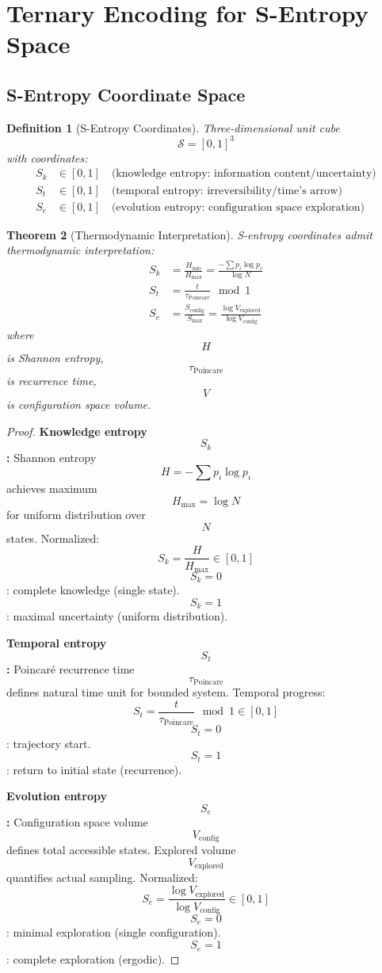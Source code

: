 \documentclass[11pt,twocolumn,a4paper]{article}
\newtheorem{theorem}{Theorem}[section]
\newtheorem{definition}[theorem]{Definition}
\theoremstyle{remark}
\begin{document}
\section{Ternary Encoding for S-Entropy Space}
\label{sec:ternary}

\subsection{S-Entropy Coordinate Space}

\begin{definition}[S-Entropy Coordinates]
\label{def:s_entropy}
Three-dimensional unit cube $$\mathcal{S} = [0,1]^3$$ with coordinates:
\begin{align}
S_k &\in [0,1] \quad \text{(knowledge entropy: information content/uncertainty)} \\
S_t &\in [0,1] \quad \text{(temporal entropy: irreversibility/time's arrow)} \\
S_e &\in [0,1] \quad \text{(evolution entropy: configuration space exploration)}
\end{align}
\end{definition}

\begin{theorem}[Thermodynamic Interpretation]
\label{thm:s_thermo}
S-entropy coordinates admit thermodynamic interpretation:
\begin{align}
S_k &= \frac{H_{\mathrm{info}}}{H_{\mathrm{max}}} = \frac{-\sum p_i \log p_i}{\log N} \\
S_t &= \frac{t}{\tau_{\mathrm{Poincare}}} \mod 1 \\
S_e &= \frac{S_{\mathrm{config}}}{S_{\mathrm{max}}} = \frac{\log V_{\mathrm{explored}}}{\log V_{\mathrm{config}}}
\end{align}
where $$H$$ is Shannon entropy, $$\tau_{\mathrm{Poincare}}$$ is recurrence time, $$V$$ is configuration space volume.
\end{theorem}

\begin{proof}
\textbf{Knowledge entropy $$S_k$$:} Shannon entropy $$H = -\sum p_i \log p_i$$ achieves maximum $$H_{\mathrm{max}} = \log N$$ for uniform distribution over $$N$$ states. Normalized:
$$
S_k = \frac{H}{H_{\mathrm{max}}} \in [0,1]
$$
$$S_k = 0$$: complete knowledge (single state). $$S_k = 1$$: maximal uncertainty (uniform distribution).

\textbf{Temporal entropy $$S_t$$:} Poincaré recurrence time $$\tau_{\mathrm{Poincare}}$$ defines natural time unit for bounded system. Temporal progress:
$$
S_t = \frac{t}{\tau_{\mathrm{Poincare}}} \mod 1 \in [0,1]
$$
$$S_t = 0$$: trajectory start. $$S_t = 1$$: return to initial state (recurrence).

\textbf{Evolution entropy $$S_e$$:} Configuration space volume $$V_{\mathrm{config}}$$ defines total accessible states. Explored volume $$V_{\mathrm{explored}}$$ quantifies actual sampling. Normalized:
$$
S_e = \frac{\log V_{\mathrm{explored}}}{\log V_{\mathrm{config}}} \in [0,1]
$$
$$S_e = 0$$: minimal exploration (single configuration). $$S_e = 1$$: complete exploration (ergodic).
\end{proof}
\end{document}
